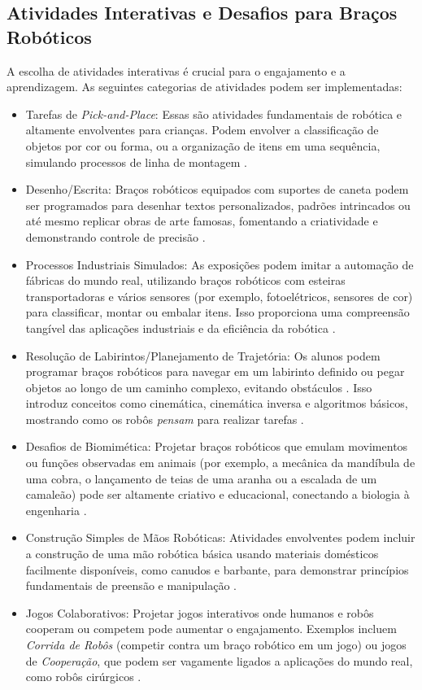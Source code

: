 \documentclass[%
  a4paper,%
  12pt,%
  fleqn,%
  english,%
  brazilian,%
]{article}
\begin{document}
\subsection{Atividades Interativas e Desafios para Braços Robóticos}
A escolha de atividades interativas é crucial para o engajamento e a aprendizagem. As seguintes categorias de atividades podem ser implementadas:
	\begin{itemize}
		\item Tarefas de \emph{Pick-and-Place}: Essas são atividades fundamentais de robótica e altamente envolventes para crianças. Podem envolver a classificação de objetos por cor ou forma, ou a organização de itens em uma sequência, simulando processos de linha de montagem \cite{robotlabDobotClassroomPack2025}.
		\item Desenho/Escrita: Braços robóticos equipados com suportes de caneta podem ser programados para desenhar textos personalizados, padrões intrincados ou até mesmo replicar obras de arte famosas, fomentando a criatividade e demonstrando controle de precisão \cite{centrePointRoboticsGames2025}.
		\item Processos Industriais Simulados: As exposições podem imitar a automação de fábricas do mundo real, utilizando braços robóticos com esteiras transportadoras e vários sensores (por exemplo, fotoelétricos, sensores de cor) para classificar, montar ou embalar itens. Isso proporciona uma compreensão tangível das aplicações industriais e da eficiência da robótica \cite{robotlabDobotClassroomPack2025}.
		\item Resolução de Labirintos/Planejamento de Trajetória: Os alunos podem programar braços robóticos para navegar em um labirinto definido ou pegar objetos ao longo de um caminho complexo, evitando obstáculos \cite{rancholabsUltimateGuide2025}. Isso introduz conceitos como cinemática, cinemática inversa e algoritmos básicos, mostrando como os robôs \emph{pensam} para realizar tarefas \cite{chang2025ConstructedResponse}.
		\item Desafios de Biomimética: Projetar braços robóticos que emulam movimentos ou funções observadas em animais (por exemplo, a mecânica da mandíbula de uma cobra, o lançamento de teias de uma aranha ou a escalada de um camaleão) pode ser altamente criativo e educacional, conectando a biologia à engenharia \cite{ross2024BeyondExhibits}. 
		\item Construção Simples de Mãos Robóticas: Atividades envolventes podem incluir a construção de uma mão robótica básica usando materiais domésticos facilmente disponíveis, como canudos e barbante, para demonstrar princípios fundamentais de preensão e manipulação \cite{scienceBuddiesRoboticsProjects2025}.
		\item Jogos Colaborativos: Projetar jogos interativos onde humanos e robôs cooperam ou competem pode aumentar o engajamento. Exemplos incluem \emph{Corrida de Robôs} (competir contra um braço robótico em um jogo) ou jogos de \emph{Cooperação}, que podem ser vagamente ligados a aplicações do mundo real, como robôs cirúrgicos \cite{centrePointRoboticsGames2025}.
	\end{itemize}
\end{document}
